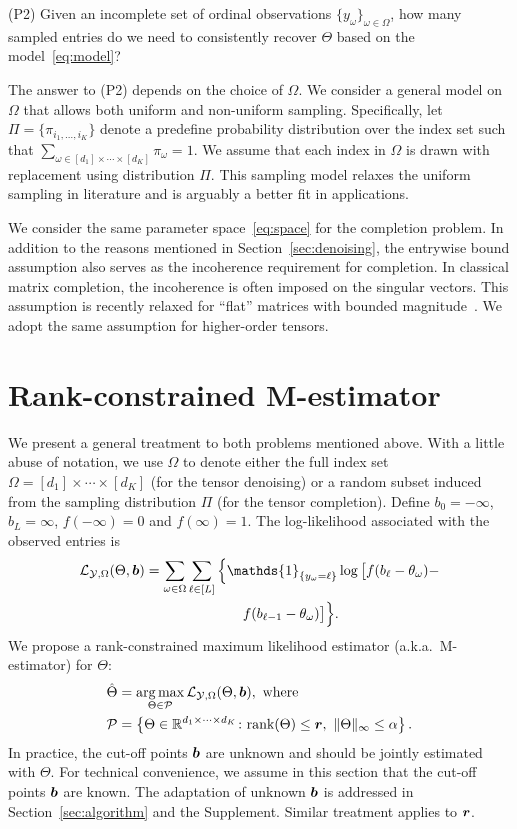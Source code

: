 \documentclass{article}
\theoremstyle{plain}
\theoremstyle{definition}
\begin{document}
(P2) Given an incomplete set of ordinal observations $\{y_{\omega}\}_{\omega\in\Omega}$, how many sampled entries do we need to consistently recover $\Theta$ based on the model~\eqref{eq:model}? 

The answer to (P2) depends on the choice of $\Omega$. We consider a general model on $\Omega$ that allows both uniform and non-uniform sampling. Specifically, let $\Pi=\{\pi_{i_1,\ldots,i_K}\}$ denote a predefine probability distribution over the index set such that $\sum_{\omega\in[d_1]\times \cdots \times [d_K]} \pi_\omega =1$. We assume that each index in $\Omega$ is drawn with replacement using distribution $\Pi$. This sampling model relaxes the uniform sampling in literature and is arguably a better fit in applications. 

We consider the same parameter space~\eqref{eq:space} for the completion problem. In addition to the reasons mentioned in Section~\ref{sec:denoising}, the entrywise bound assumption also serves as the incoherence requirement for completion. In classical matrix completion, the incoherence is often imposed on the singular vectors. This assumption is recently relaxed for ``flat'' matrices with bounded magnitude~\cite{negahban2011estimation,cai2013max,bhaskar20151}. We adopt the same assumption for higher-order tensors. 

\section{Rank-constrained M-estimator}\label{sec:theory}
We present a general treatment to both problems mentioned above. With a little abuse of notation, we use $\Omega$ to denote either the full index set $\Omega=[d_1]\times \cdots \times [d_K]$ (for the tensor denoising) or a random subset induced from the sampling distribution $\Pi$ (for the tensor completion). Define $b_0=-\infty$, $b_L=\infty$, $f(-\infty)=0$ and $f(\infty)=1$. The log-likelihood associated with the observed entries is
\begin{align}\label{eq:objective}
\logl(\Theta, \mb)&=\sum_{\omega\in\Omega}\sum_{\ell\in[L]} \Big\{\mathds{1}_{\{y_\omega=\ell\}} \log \big[f(b_\ell-\theta_\omega)- \notag \\
&\quad \quad \quad \quad \quad \quad \quad  f(b_{\ell-1}-\theta_\omega)\big]\Big\}.
\end{align}
We propose a rank-constrained maximum likelihood estimator (a.k.a.\ M-estimator) for $\Theta$:
\begin{align}\label{eq:estimator}
\hat \Theta&=\argmax_{\Theta\in \tP}\logl(\Theta, \mb),\ \text{where}\notag \\
\tP&=\left\{\Theta\in\mathbb{R}^{d_1\times \cdots \times d_K} \colon \text{rank}(\Theta)\leq \mr,\ \mnormSize{}{\Theta}\leq \alpha\right\}.
 \end{align}
In practice, the cut-off points $\bm{b}$ are unknown and should be jointly estimated with $\Theta$. For technical convenience, we assume in this section that the cut-off points $\bm{b}$ are known. The adaptation of unknown $\bm{b}$ is addressed in Section~\ref{sec:algorithm} and the Supplement. Similar treatment applies to $\bm{r}$. 
\end{document}
